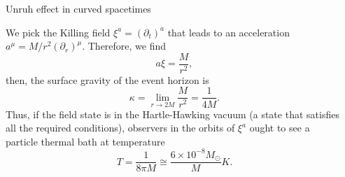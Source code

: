 \documentclass[final, border=3pt]{beamer}
\newlength{\sepmargin}
\newlength{\onecolwid}
\begin{document}
\begin{frame}[t]
\begin{columns}[t]
\begin{column}{\onecolwid}
\begin{block}{Unruh effect in curved spacetimes}
\begin{figure}
                \end{figure}
                We pick the Killing field \(\xi^a=\left(\partial_t\right)^a\) that leads to an acceleration \(a^{\mu}=M/r^2\left(\partial_r\right)^{\mu}\). Therefore, we find
                \begin{equation}
                    a\xi=\frac{M}{r^2},
                \end{equation}
                then, the surface gravity of the event horizon is
                \begin{equation}
                    \kappa=\lim_{r\to2M}\frac{M}{r^2}=\frac{1}{4M}.
                \end{equation}
                Thus, if the field state is in the Hartle-Hawking vacuum (a state that satisfies all the required conditions), observers in the orbits of \(\xi^a\) ought to see a particle thermal bath at temperature
                \begin{equation}
                    T=\frac{1}{8\pi M}\cong\frac{6\times10^{-8}M_{\odot}}{M}\unit{K}.
                \end{equation}
		    \end{block}
        \end{column}
      
        \begin{column}{\sepmargin} \end{column}
        \end{columns} 
       
      \begin{columns}[t] %
      

\end{columns}
\end{frame}
\end{document}
